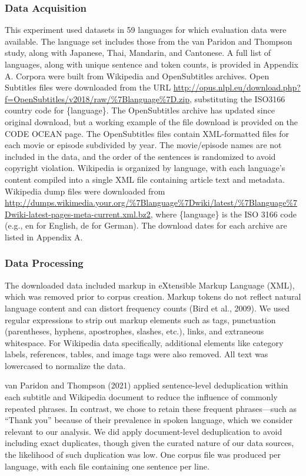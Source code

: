 \documentclass[
  english,
  man,floatsintext]{apa6}
\begin{document}
\subsubsection{Data Acquisition}\label{data-acquisition}

This experiment used datasets in 59 languages for which evaluation data were available. The language set includes those from the van Paridon and Thompson study, along with Japanese, Thai, Mandarin, and Cantonese. A full list of languages, along with unique sentence and token counts, is provided in Appendix A. Corpora were built from Wikipedia and OpenSubtitles archives. Open Subtitles files were downloaded from the URL \url{http://opus.nlpl.eu/download.php?f=OpenSubtitles/v2018/raw/\%7Blanguage\%7D.zip}, substituting the ISO3166 country code for \{language\}. The OpenSubtitles archive has updated since original download, but a working example of the file download is provided on the CODE OCEAN page. The OpenSubtitles files contain XML-formatted files for each movie or episode subdivided by year. The movie/episode names are not included in the data, and the order of the sentences is randomized to avoid copyright violation. Wikipedia is organized by language, with each language's content compiled into a single XML file containing article text and metadata. Wikipedia dump files were downloaded from \url{http://dumps.wikimedia.your.org/\%7Blanguage\%7Dwiki/latest/\%7Blanguage\%7Dwiki-latest-pages-meta-current.xml.bz2}, where \{language\} is the ISO 3166 code (e.g., en for English, de for German). The download dates for each archive are listed in Appendix A.

\subsubsection{Data Processing}\label{data-processing}

The downloaded data included markup in eXtensible Markup Language (XML), which was removed prior to corpus creation. Markup tokens do not reflect natural language content and can distort frequency counts (Bird et al., 2009). We used regular expressions to strip out markup elements such as tags, punctuation (parentheses, hyphens, apostrophes, slashes, etc.), links, and extraneous whitespace. For Wikipedia data specifically, additional elements like category labels, references, tables, and image tags were also removed. All text was lowercased to normalize the data.

van Paridon and Thompson (2021) applied sentence-level deduplication within each subtitle and Wikipedia document to reduce the influence of commonly repeated phrases. In contrast, we chose to retain these frequent phrases---such as ``Thank you'' because of their prevalence in spoken language, which we consider relevant to our analysis. We did apply document-level deduplication to avoid including exact duplicates, though given the curated nature of our data sources, the likelihood of such duplication was low. One corpus file was produced per language, with each file containing one sentence per line.
\end{document}
